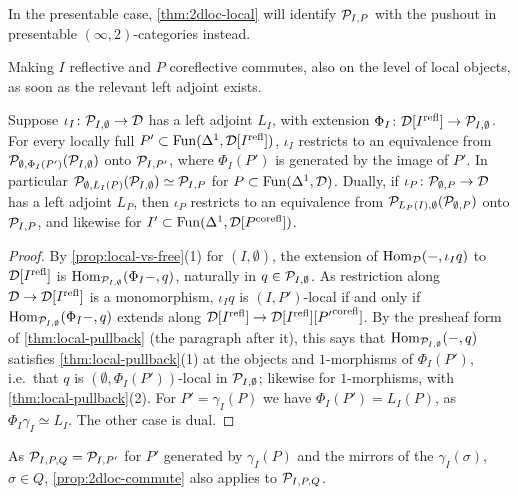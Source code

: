 %
In the presentable case, \cref{thm:2dloc-local} will identify $\mathcal{P}_{I,P}$ with
the pushout in presentable $(\infty,2)$-categories instead.

%
Making $I$ reflective and $P$ coreflective commutes,
also on the level of local objects, as soon as the relevant left adjoint exists.

\begin{prop}
\label{prop:2dloc-commute}
%
Suppose
$\iota_{I}\colon \mathcal{P}_{I,\emptyset} \to \mathcal{D}$
has a left adjoint $L_{I}$, with extension
$\Phi_{I}\colon \mathcal{D}[{I}^{\mathrm{refl}}] \to \mathcal{P}_{I,\emptyset}$.
For every locally full
$P' \subset \operatorname{Fun}(\Delta^{1},\mathcal{D}[{I}^{\mathrm{refl}}])$,
$\iota_{I}$ restricts to an equivalence from
$\mathcal{P}_{\emptyset,\Phi_{I}(P')}(\mathcal{P}_{I,\emptyset})$
onto $\mathcal{P}_{I,P'}$, where $\Phi_{I}(P')$ is generated by the image of $P'$.
In particular
$\mathcal{P}_{\emptyset,L_{I}(P)}(\mathcal{P}_{I,\emptyset}) \simeq \mathcal{P}_{I,P}$
for
$P \subset \operatorname{Fun}(\Delta^{1},\mathcal{D})$.
Dually, if
$\iota_{P}\colon \mathcal{P}_{\emptyset,P} \to \mathcal{D}$
has a left adjoint $L_{P}$, then $\iota_{P}$ restricts to an equivalence from
$\mathcal{P}_{L_{P}(I),\emptyset}(\mathcal{P}_{\emptyset,P})$
onto $\mathcal{P}_{I,P}$, and likewise for
$I' \subset \operatorname{Fun}(\Delta^{1},\mathcal{D}[{P}^{\mathrm{corefl}}])$.
\end{prop}

\begin{proof}
%
By \cref{prop:local-vs-free}(1) for $(I,\emptyset)$, the extension of
$\operatorname{Hom}_{\mathcal{D}}(-,\iota_{I}q)$
to $\mathcal{D}[{I}^{\mathrm{refl}}]$ is
$\operatorname{Hom}_{\mathcal{P}_{I,\emptyset}}(\Phi_{I}-,q)$,
naturally in
$q \in \mathcal{P}_{I,\emptyset}$.
As restriction along $\mathcal{D} \to \mathcal{D}[{I}^{\mathrm{refl}}]$ is a monomorphism,
$\iota_{I}q$ is $(I,P')$-local if and only if
$\operatorname{Hom}_{\mathcal{P}_{I,\emptyset}}(\Phi_{I}-,q)$
extends along
$\mathcal{D}[{I}^{\mathrm{refl}}] \to \mathcal{D}[{I}^{\mathrm{refl}}][{P'}^{\mathrm{corefl}}]$.
By the presheaf form of \cref{thm:local-pullback} (the paragraph after it),
this says that
$\operatorname{Hom}_{\mathcal{P}_{I,\emptyset}}(-,q)$
satisfies \cref{thm:local-pullback}(1) at the objects and $1$-morphisms of
$\Phi_{I}(P')$, i.e.\ that $q$ is
$(\emptyset,\Phi_{I}(P'))$-local
in $\mathcal{P}_{I,\emptyset}$; likewise for $1$-morphisms,
with \cref{thm:local-pullback}(2). For $P' = \gamma_{I}(P)$ we have
$\Phi_{I}(P') = L_{I}(P)$,
as
$\Phi_{I}\gamma_{I} \simeq L_{I}$.
The other case is dual.
\end{proof}

%
As
$\mathcal{P}_{I,P,Q} = \mathcal{P}_{I,P'}$
for $P'$ generated by $\gamma_{I}(P)$ and the
mirrors of the $\gamma_{I}(\sigma)$, $\sigma \in Q$,
\cref{prop:2dloc-commute} also applies to $\mathcal{P}_{I,P,Q}$.


